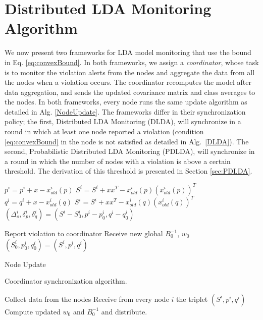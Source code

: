 \section{Distributed LDA Monitoring Algorithm}
We now present two frameworks for LDA model monitoring that use
the bound in Eq. \ref{eq:convexBound}. 
In both frameworks, 
we assign a \textit{coordinator}, whose task is to monitor the violation alerts from the nodes and aggregate the data from all the nodes when a violation occurs. The coordinator recomputes the model after data aggregation, and sends the updated covariance matrix 
and class averages to the nodes.
In both frameworks, every node runs the same
update algorithm as detailed in Alg. \ref{NodeUpdate}.
The frameworks differ in their synchronization policy; 
the first, Distributed LDA Monitoring (DLDA), will synchronize in a round
in which at least one node  reported a violation (condition \ref{eq:convexBound} in the node is not satisfied as detailed in Alg.~\ref{DLDA}).
The second, Probabilistic Distributed LDA Monitoring (PDLDA), will synchronize in a round in which the number of nodes with a violation is above a certain
threshold.
The derivation of this threshold is presented in Section \ref{sec:PDLDA}.


\begin{algorithm}
\SetAlgoNoLine
{}
{ $p^i = p^i + x - x_{old}^i(p)$ \;
 $S^i = S^i +xx^T - x_{old}^i(p)(x_{old}^i(p))^T$}
\Else
{$q^i = q^i + x -x_{old}^i(q)$ \;
 $S^i = S^i +xx^T - x_{old}^i(q)(x_{old}^i(q))^T$ \;
$(\Delta_s^i,\delta^i_p,\delta_q^i) = (S^i-S^i_0,p^i-p^i_0,q^i-q^i_0)$ }

{Report violation to coordinator \;
Receive new global $B_0^{-1}$, $w_0$ \;
$(S_0^i,p_0^i,q_0^i) = (S^i,p^i,q^i)$ }

\caption{Node Update}

\label{NodeUpdate}
\end{algorithm}


\begin{algorithm}
\SetAlgoNoLine
\caption{Coordinator synchronization algorithm.}\label{DLDA}
{
Collect data from the nodes \;
Receive from every node $i$ the triplet $(S^i,p^i,q^i)$ \;
Compute updated $w_0$ and $B_0^{-1}$ and distribute.}
\end{algorithm}
%
